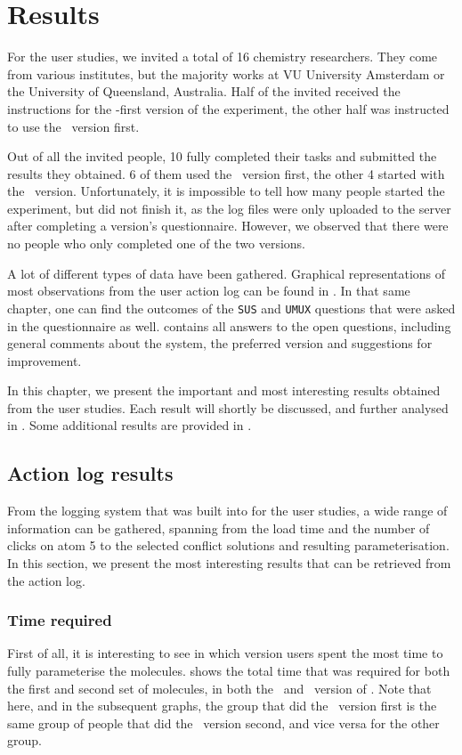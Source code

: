 \chapter{Results}

For the user studies, we invited a total of 16 chemistry researchers. They come from various institutes, but the majority works at VU University Amsterdam or the University of Queensland, Australia. Half of the invited received the instructions for the \IDa-first version of the experiment, the other half was instructed to use the \IDb\ version first.

Out of all the invited people, 10 fully completed their tasks and submitted the results they obtained. 6 of them used the \IDa\ version first, the other 4 started with the \IDb\ version. Unfortunately, it is impossible to tell how many people started the experiment, but did not finish it, as the log files were only uploaded to the server after completing a version's questionnaire. However, we observed that there were no people who only completed one of the two versions.

A lot of different types of data have been gathered. Graphical representations of most observations from the user action log can be found in . In that same chapter, one can find the outcomes of the \verb|SUS| and \verb|UMUX| questions that were asked in the questionnaire as well.  contains all answers to the open questions, including general comments about the system, the preferred version and suggestions for improvement.

In this chapter, we present the important and most interesting results obtained from the user studies. Each result will shortly be discussed, and further analysed in . Some additional results are provided in .



\section{Action log results}
From the logging system that was built into \oframp{} for the user studies, a wide range of information can be gathered, spanning from the load time and the number of clicks on atom 5 to the selected conflict solutions and resulting parameterisation. In this section, we present the most interesting results that can be retrieved from the action log.


\subsection{Time required}
First of all, it is interesting to see in which version users spent the most time to fully parameterise the molecules.  shows the total time that was required for both the first and second set of molecules, in both the \IDa\ and \IDb\ version of \oframp. Note that here, and in the subsequent graphs, the group that did the \IDa\ version first is the same group of people that did the \IDb\ version second, and vice versa for the other group.

